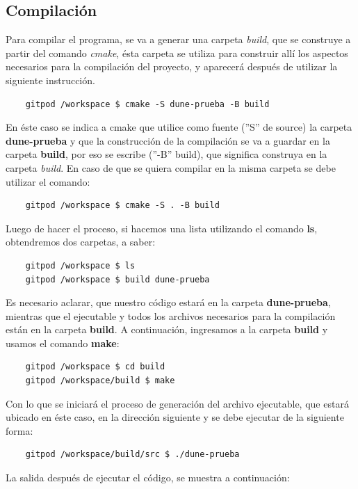 \subsection{Compilación}
Para compilar el programa, se va a generar una carpeta \textit{build},
que se construye a partir del comando \textit{cmake}, ésta carpeta
se utiliza para construir allí los aspectos necesarios para la compilación del proyecto, y aparecerá después
de utilizar la siguiente instrucción.
\begin{verbatim}
	gitpod /workspace $ cmake -S dune-prueba -B build
\end{verbatim}
En éste caso se indica a cmake que utilice como fuente (''S'' de source) la carpeta \textbf{dune-prueba} y
que la construcción de la compilación se va a guardar en la carpeta \textbf{build}, por eso se escribe (''-B'' build),
que significa construya en la carpeta \textit{build}.
En caso de que se quiera compilar en la misma carpeta se debe utilizar el comando:
\begin{verbatim}
	gitpod /workspace $ cmake -S . -B build
\end{verbatim}
Luego de hacer el proceso, si hacemos una lista utilizando el comando \textbf{ls}, obtendremos dos carpetas, a saber:
\begin{verbatim}
	gitpod /workspace $ ls
	gitpod /workspace $ build dune-prueba
\end{verbatim}
Es necesario aclarar, que nuestro código estará en la carpeta \textbf{dune-prueba}, mientras que el ejecutable y
todos los archivos necesarios para la compilación están en la carpeta \textbf{build}.  A continuación, ingresamos
a la carpeta \textbf{build} y usamos el comando \textbf{make}:
\begin{verbatim}
	gitpod /workspace $ cd build
	gitpod /workspace/build $ make
\end{verbatim}
Con lo que se iniciará el proceso de generación del archivo ejecutable, que estará ubicado en éste caso, en
la dirección siguiente y se debe ejecutar de la siguiente forma:
\begin{verbatim}
	gitpod /workspace/build/src $ ./dune-prueba
\end{verbatim}
La salida después de ejecutar el código, se muestra a continuación:
\begin{listing}[ht!]
	\inputminted{bash}{dune-learn-1.txt}
\end{listing}

\immediate{}
